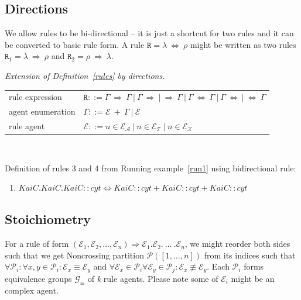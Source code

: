 \documentclass[12pt]{fithesis2}
\begin{document}
\subsection{Directions}

We allow rules to be bi-directional -- it is just a shortcut for two rules and it can be converted to basic rule form. A rule $\mathtt{R} = \lambda ~\Leftrightarrow~ \rho$ might be written as two rules $\mathtt{R}_1 = \lambda ~\Rightarrow~ \rho$ and $\mathtt{R}_2 = \rho ~\Rightarrow~ \lambda$.

\begin{definition}\label{rules:directions}
\emph{Extension of Definition~\ref{rules} by directions.}

\begin{center}
{\small
\hspace*{-1cm}\begin{tabular}{ l l }
 rule expression & $\mathtt{R} ::= \Gamma ~\Rightarrow~ \Gamma ~|~ \Gamma ~\Rightarrow ~|~ \Rightarrow~ \Gamma ~|~ \Gamma ~\Leftrightarrow~ \Gamma ~|~ \Gamma ~\Leftrightarrow ~|~ \Leftrightarrow~ \Gamma $\\
 agent enumeration & $\Gamma ::= \mathcal{E}~ +~\Gamma ~|~ \mathcal{E}$\\
 rule agent & $\mathcal{E} ::= n \in \mathcal{E}_\mathcal{A}~|~n \in \mathcal{E}_\mathcal{T}~|~n \in \mathcal{E}_\mathcal{X}$\\
\end{tabular}
}
\end{center}
\end{definition}

\begin{runningExample}\label{run2}
$ $

\noindent Definition of rules 3 and 4 from Running example~\ref{run1} using bidirectional rule:
\begin{enumerate}
\item $KaiC.KaiC.KaiC::cyt \Leftrightarrow KaiC::cyt + KaiC::cyt + KaiC::cyt$
\end{enumerate}
\end{runningExample}

\subsection{Stoichiometry}

For a rule of form $(\mathcal{E}_1, \mathcal{E}_2, \ldots, \mathcal{E}_n) \Rightarrow \mathcal{E}_1.\mathcal{E}_2.~\ldots~.\mathcal{E}_n$, we might reorder both sides such that we get Noncrossing partition $\mathcal{P}([1,\ldots,n])$ from its indices such that $\forall \mathcal{P}_i: \forall x,y \in \mathcal{P}_i: \mathcal{E}_x \equiv \mathcal{E}_y$ and $\forall \mathcal{E}_x \in \mathcal{P}_i \forall \mathcal{E}_y \in \mathcal{P}_j: \mathcal{E}_x \not\equiv \mathcal{E}_y$. Each $\mathcal{P}_i$ forms equivalence groups $\mathcal{G}_\equiv$ of \textit{k} rule agents. Please note some of $\mathcal{E}_i$ might be an complex agent.
\end{document}
